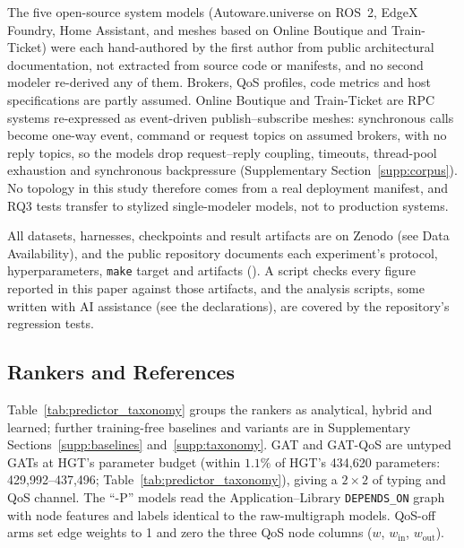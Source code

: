 The five open-source system models (Autoware.universe on ROS~2, EdgeX Foundry, Home Assistant, and meshes based on Online Boutique and Train-Ticket) were each hand-authored by the first author from public architectural documentation, not extracted from source code or manifests, and no second modeler re-derived any of them. Brokers, QoS profiles, code metrics and host specifications are partly assumed. Online Boutique and Train-Ticket are RPC systems re-expressed as event-driven publish--subscribe meshes: synchronous calls become one-way event, command or request topics on assumed brokers, with no reply topics, so the models drop request--reply coupling, timeouts, thread-pool exhaustion and synchronous backpressure (Supplementary Section~\ref{supp:corpus}). No topology in this study therefore comes from a real deployment manifest, and RQ3 tests transfer to stylized single-modeler models, not to production systems.

All datasets, harnesses, checkpoints and result artifacts are on Zenodo (see Data Availability), and the public repository documents each experiment's protocol, hyperparameters, \texttt{make} target and artifacts (\sagexperiments). A script checks every figure reported in this paper against those artifacts, and the analysis scripts, some written with AI assistance (see the declarations), are covered by the repository's regression tests.

\subsection{Rankers and References}
\label{sec:6.2}

Table~\ref{tab:predictor_taxonomy} groups the rankers as analytical, hybrid and learned; further training-free baselines and variants are in Supplementary Sections~\ref{supp:baselines} and~\ref{supp:taxonomy}. GAT and GAT-QoS are untyped GATs at HGT's parameter budget (within $1.1\%$ of HGT's 434{,}620 parameters: 429{,}992--437{,}496; Table~\ref{tab:predictor_taxonomy}), giving a $2\times2$ of typing and QoS channel. The ``-P'' models read the Application--Library \texttt{DEPENDS\_ON} graph with node features and labels identical to the raw-multigraph models. QoS-off arms set edge weights to 1 and zero the three QoS node columns ($w$, $w_{\text{in}}$, $w_{\text{out}}$).

